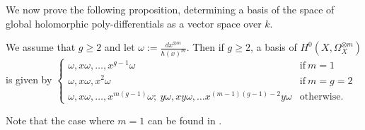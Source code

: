We now prove the following proposition, determining a basis of the space of global holomorphic poly-differentials as a vector space over $k$.

    \begin{prop}\label{propbasishyperellipticp=2}
    We assume that $g\geq 2$ and let $\omega:= \frac{dx^{\otimes m}}{h(x)^m}$. 
    Then if $g\geq 2$, a basis of $H^0(X,\Omega_X^{\otimes m})$ is given by
        $\begin{cases}
        \omega, x\omega, \ldots , x^{g-1}\omega &  \mbox{if}\ m=1 \\
        \omega, x\omega, x^2\omega & \mbox{if}\ m=g=2 \\
        \omega, x\omega, \ldots, x^{m(g-1)}\omega;\  y\omega, xy\omega, \ldots x^{(m-1)(g-1)-2}y\omega & \mbox{otherwise.}
        \end{cases}$
    \end{prop}
    
    \begin{rem}
    Note that the case where $m=1$ can be found in \cite[Prop. 7.4.26]{liu}.
    \end{rem}


